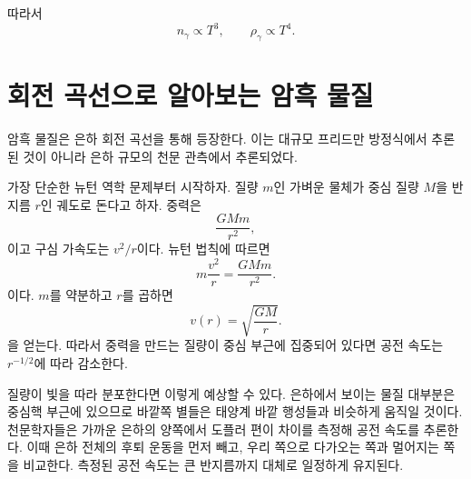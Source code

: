 \begin{classroomqa}
\end{classroomqa}

\begin{classroomqa}
\end{classroomqa}

따라서
\begin{equation}
n_\gamma\propto T^3,
\qquad
\rho_\gamma\propto T^4.
\end{equation}

\section{회전 곡선으로 알아보는 암흑 물질}

암흑 물질은 은하 회전 곡선을 통해 등장한다. 이는 대규모 프리드만 방정식에서 추론된 것이 아니라 은하 규모의 천문 관측에서 추론되었다.

가장 단순한 뉴턴 역학 문제부터 시작하자. 질량 \(m\)인 가벼운 물체가 중심 질량 \(M\)을 반지름 \(r\)인 궤도로 돈다고 하자. 중력은
\begin{equation}
\frac{GMm}{r^2},
\end{equation}
이고 구심 가속도는 \(v^2/r\)이다. 뉴턴 법칙에 따르면
\begin{equation}
m\frac{v^2}{r}=\frac{GMm}{r^2}.
\end{equation}
이다. \(m\)를 약분하고 \(r\)를 곱하면
\begin{equation}
v(r)=\sqrt{\frac{GM}{r}}.
\end{equation}
을 얻는다. 따라서 중력을 만드는 질량이 중심 부근에 집중되어 있다면 공전 속도는 \(r^{-1/2}\)에 따라 감소한다.

질량이 빛을 따라 분포한다면 이렇게 예상할 수 있다. 은하에서 보이는 물질 대부분은 중심핵 부근에 있으므로 바깥쪽 별들은 태양계 바깥 행성들과 비슷하게 움직일 것이다. 천문학자들은 가까운 은하의 양쪽에서 도플러 편이 차이를 측정해 공전 속도를 추론한다. 이때 은하 전체의 후퇴 운동을 먼저 빼고, 우리 쪽으로 다가오는 쪽과 멀어지는 쪽을 비교한다. 측정된 공전 속도는 큰 반지름까지 대체로 일정하게 유지된다.

